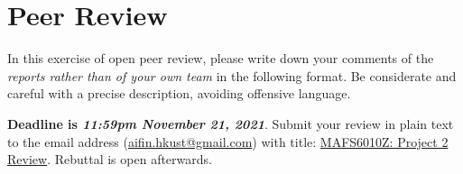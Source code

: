 \documentclass[11pt]{article}
\begin{document}
\newpage

\section*{Peer Review}

In this exercise of open peer review, please write down your comments of the \emph{reports rather than of your own team} in the following format. Be considerate and careful with a precise description, avoiding offensive language. 

{\bf Deadline is \emph{11:59pm November 21, 2021}}. Submit your review in plain text to the email address (\url{aifin.hkust@gmail.com}) with title: \underline{MAFS6010Z: Project 2 Review}. Rebuttal is open afterwards.




\end{document}
